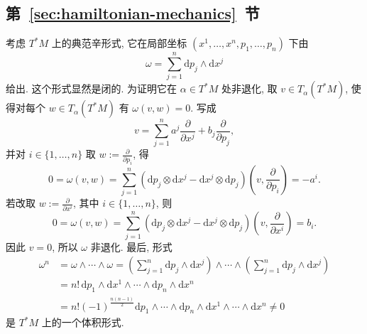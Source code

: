 \subsection{\texorpdfstring{第~\ref{sec:hamiltonian-mechanics}~节}{Hamilton 力学}}\label{subsec:solutions-hamiltonian-mechanics}

\begin{description}[font=\normalfont,leftmargin=2em,labelwidth=1.5em]
考虑 $T^*M$ 上的典范辛形式, 它在局部坐标 $(x^1,\ldots,x^n,p_1,\ldots,p_n)$ 下由
\[
  \omega=\sum_{j=1}^n\mathrm{d}p_j\wedge\mathrm{d}x^j
\]
给出. 这个形式显然是闭的. 为证明它在 $\alpha\in T^*M$ 处非退化, 取 $v\in T_\alpha(T^*M)$, 使得对每个 $w\in T_\alpha(T^*M)$ 有 $\omega(v,w)=0$. 写成
\[
  v=\sum_{j=1}^n a^j\frac{\partial}{\partial x^j}+b_j\frac{\partial}{\partial p_j},
\]
并对 $i\in\{1,\ldots,n\}$ 取 $w:=\frac{\partial}{\partial p_i}$, 得
\[
  0=\omega(v,w)=\sum_{j=1}^n(\mathrm{d}p_j\otimes\mathrm{d}x^j-\mathrm{d}x^j\otimes\mathrm{d}p_j)
     \left(v,\frac{\partial}{\partial p_i}\right)=-a^i.
\]
若改取 $w:=\frac{\partial}{\partial x^i}$, 其中 $i\in\{1,\ldots,n\}$, 则
\[
  0=\omega(v,w)=\sum_{j=1}^n(\mathrm{d}p_j\otimes\mathrm{d}x^j-\mathrm{d}x^j\otimes\mathrm{d}p_j)
     \left(v,\frac{\partial}{\partial x^i}\right)=b_i.
\]
因此 $v=0$, 所以 $\omega$ 非退化. 最后, 形式
\begin{align*}
  \omega^n&=\omega\wedge\cdots\wedge\omega
     =\left(\sum_{j=1}^n\mathrm{d}p_j\wedge\mathrm{d}x^j\right)\wedge\cdots\wedge
       \left(\sum_{j=1}^n\mathrm{d}p_j\wedge\mathrm{d}x^j\right)\\
  &=n!\,\mathrm{d}p_1\wedge\mathrm{d}x^1\wedge\cdots\wedge\mathrm{d}p_n\wedge\mathrm{d}x^n\\
  &=n!(-1)^{\frac{n(n-1)}2}
        \mathrm{d}p_1\wedge\cdots\wedge\mathrm{d}p_n\wedge\mathrm{d}x^1\wedge\cdots\wedge\mathrm{d}x^n
        \ne0
\end{align*}
是 $T^*M$ 上的一个体积形式.


\end{description}
